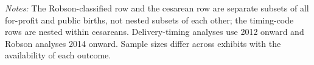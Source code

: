 \begin{table}[H]\centering
\caption{\textbf{Sample construction for the SINASC analyses}}
\label{tab:sampleflow}
\small
\small\setlength{\tabcolsep}{4pt}
\begin{minipage}{\linewidth}\footnotesize
\textit{Notes:} The Robson-classified row and the cesarean row are separate subsets of all for-profit and public births, not nested subsets of each other; the timing-code rows are nested within cesareans. Delivery-timing analyses use 2012 onward and Robson analyses 2014 onward. Sample sizes differ across exhibits with the availability of each outcome.
\end{minipage}
\end{table}
